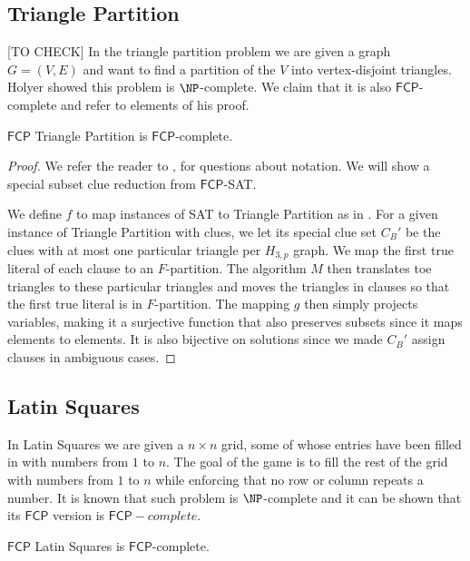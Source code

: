 \documentclass[runningheads,a4paper]{llncs}
\begin{document}
\subsection{Triangle Partition}
[TO CHECK] 
In the triangle partition problem we are given a graph $G = (V,E)$ and want to find a partition of the $V$ into vertex-disjoint triangles. Holyer  \cite{holyer1981np} showed this problem is $\NP$-complete. We claim that it is also $\mathsf{FCP}$-complete and refer to elements of his proof. 

\begin{theorem}
$\mathsf{FCP}$ Triangle Partition is $\mathsf{FCP}$-complete.
\end{theorem}

\begin{proof}
We refer the reader to \cite{holyer1981np}, \cite{colbourn1984complexity} for questions about notation. We will show a special subset clue reduction from $\mathsf{FCP}$-SAT. 

We define $f$ to map instances of SAT to Triangle Partition as in \cite{holyer1981np}. For a given instance of Triangle Partition with clues, we let its special clue set $C_B'$ be the clues with at most one particular triangle per $H_{3,p}$ graph. We map the first true literal of each clause to an $F$-partition. The algorithm $M$ then translates toe triangles to these particular triangles and moves the triangles in clauses so that the first true literal is in $F$-partition. The mapping $g$ then simply projects variables, making it a surjective function that also preserves subsets since it maps elements to elements. It is also bijective on solutions since we made $C_B'$ assign clauses in ambiguous cases.   
\end{proof}

\subsection{Latin Squares}

In Latin Squares we are given a $n \times n$ grid, some of whose entries have been filled in with numbers from $1$ to $n$. The goal of the game is to fill the rest of the grid with numbers from $1$ to $n$ while enforcing that no row or column repeats a number. It is known that such problem is $\NP$-complete and it can be shown that its $\mathsf{FCP}$ version is $\mathsf{FCP}-complete$. 

\begin{theorem}
$\mathsf{FCP}$ Latin Squares is $\mathsf{FCP}$-complete.
\end{theorem}
\end{document}
